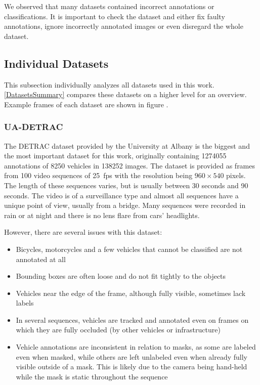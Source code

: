 We observed that many datasets contained incorrect annotations or
classifications. It is important to check the dataset and either fix faulty
annotations, ignore incorrectly annotated images or even disregard the whole
dataset.



\subsection{Individual Datasets}

This subsection individually analyzes all datasets used in this work.
\autoref{DatasetsSummary} compares these datasets on a higher level for an
overview. Example frames of each dataset are shown in figure   .


\subsubsection*{UA-DETRAC}
\label{DetracDataset}

The DETRAC dataset \cite{detrac} provided by the University at Albany is the
biggest and the most important dataset for this work, originally containing
\num{1274055} annotations of \num{8250} vehicles in \num{138252} images. The
dataset is provided as frames from 100 video sequences of \SI{25}{fps} with the
resolution being $960 \times 540$ pixels. The length of these sequences varies, but
is usually between 30 seconds and 90 seconds. The video is of a surveillance
type and almost all sequences have a unique point of view, usually from a
bridge. Many sequences were recorded in rain or at night and there is no lens
flare from cars' headlights.

However, there are several issues with this dataset:
\begin{itemize}
    \item Bicycles, motorcycles and a few vehicles that cannot be classified are
    not annotated at all
    \item Bounding boxes are often loose and do not fit tightly to the objects
    \item Vehicles near the edge of the frame, although fully visible,
    sometimes lack labels
    \item In several sequences, vehicles are tracked and annotated even on
    frames on which they are fully occluded (by other vehicles or infrastructure)
    \item Vehicle annotations are inconsistent in relation to masks, as some are
    labeled even when masked, while others are left unlabeled even when already
    fully visible outside of a mask. This is likely due to the camera being
    hand-held while the mask is static throughout the sequence
\end{itemize}

